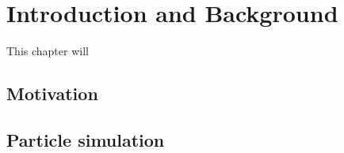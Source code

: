 \chapter[Introduction]{Introduction and Background}
\label{cp:introduction}

{
\parindent0pt
This chapter will \textellipsis
}

\section{Motivation}

\section{Particle simulation}

